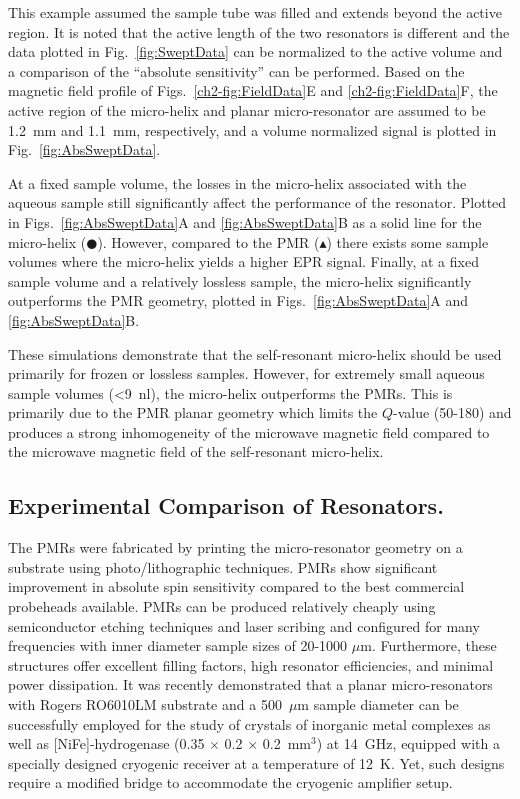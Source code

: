 This example assumed the sample tube was filled and extends beyond the active region. It is noted that the active length of the two resonators is different and the data plotted in Fig.~\ref{fig:SweptData} can be normalized to the active volume and a comparison of the ``absolute sensitivity'' can be performed. Based on the magnetic field profile of  Figs.~\ref{ch2-fig:FieldData}E and \ref{ch2-fig:FieldData}F, the active region of the micro-helix and planar micro-resonator are assumed to be 1.2~mm and 1.1~mm, respectively, and a volume normalized signal is plotted in Fig.~\ref{fig:AbsSweptData}. 

At a fixed sample volume, the losses in the micro-helix associated with the aqueous sample still significantly affect the performance of the resonator.  Plotted in Figs.~\ref{fig:AbsSweptData}A and \ref{fig:AbsSweptData}B as a solid line for the micro-helix ($\CIRCLE$). However, compared to the PMR ($\blacktriangle$) there exists some sample volumes where the micro-helix yields a higher EPR signal. Finally, at a fixed sample volume and a relatively lossless sample, the micro-helix significantly outperforms the PMR geometry, plotted in Figs.~\ref{fig:AbsSweptData}A and \ref{fig:AbsSweptData}B.

These simulations demonstrate that the self-resonant micro-helix should be used primarily for frozen or lossless samples. However, for extremely small aqueous sample volumes (<9~nl), the micro-helix outperforms the PMRs. This is primarily due to the PMR planar geometry which limits the $Q$-value (50-180) and produces a strong inhomogeneity of the microwave magnetic field compared to the microwave magnetic field of the self-resonant micro-helix. 

\subsection{Experimental Comparison of Resonators.}
The PMRs were fabricated by printing the micro-resonator geometry on a substrate using photo\-/lithographic techniques. \cite{Suter2005, Suter2008, suter2015} PMRs show significant improvement in absolute spin sensitivity compared to the best commercial probeheads available. \cite{ ReijerseSavitsky2017} PMRs can be produced relatively cheaply using semiconductor etching techniques and laser scribing and configured for many frequencies with inner diameter sample sizes of 20-1000 $\mu$m. Furthermore, these structures offer excellent filling factors, high resonator efficiencies, and minimal power dissipation. It was recently demonstrated that a planar micro-resonators with Rogers RO6010LM substrate and a 500~$\mu$m sample diameter can be successfully employed for the study of crystals of inorganic metal complexes as well as [NiFe]-hydrogenase (0.35 $\times$ 0.2 $\times$ 0.2~mm$^3$) at 14~GHz, equipped with a specially designed cryogenic receiver at a temperature of 12~K. \cite{NARKOWICZ201379} Yet, such designs require a modified bridge to accommodate the cryogenic amplifier setup.

